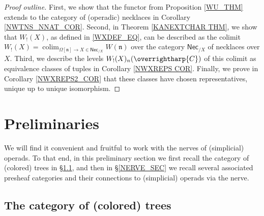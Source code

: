 \documentclass[a4paper,10pt
,draft
]{article}%
\numberwithin{equation}{section}
\numberwithin{figure}{section}
\theoremstyle{definition} %
\newcommand{\vect}[1]{\text{\overrightharp{\ensuremath{#1}}}}
\DeclareMathOperator{\colim}{colim}%
\newcommand{\1}{\ensuremath{\mathbbm 1}}%
\begin{document}
\begin{proof}[Proof outline]
        First, we show that the functor from Proposition \ref{WU_THM} extends to the category of (operadic) necklaces in Corollary \ref{NWTNS_NNAT_COR}.
        Second, in Theorem \ref{KANEXTCHAR THM},
        we show that $W_!(X)$, as defined in \eqref{WXDEF_EQ}, can be described as
        the colimit
        $W_!(X) = \colim_{\Omega[\mathfrak n] \to X \in \mathsf{Nec}_{/ X}} W(\mathfrak n)$
        over the category $\mathsf{Nec}_{/ X}$ of necklaces over $X$.
        Third, we describe the levels $W_!(X)_n(\vect C)$ of this colimit as equivalence classes of tuples
        in Corollary \ref{NWXREPS COR}.
        Finally, we prove in Corollary \ref{NWXREPS2_COR} that these classes have chosen representatives, unique up to unique isomorphism.
\end{proof}






\section{Preliminaries}

We will find it convenient and fruitful to
work with the nerves of (simplicial) operads.
To that end, in this preliminary section
we first recall the category of (colored) trees in \S \ref{TREES_SEC},
and then in \S \ref{NERVE_SEC} we recall several associated presheaf categories and their connections to (simplicial) operads via the nerve.


\subsection{The category of (colored) trees}
\label{TREES_SEC}
\end{document}
